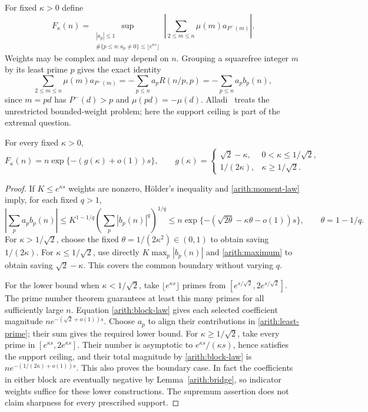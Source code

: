 For fixed $\kappa>0$ define
\[
 F_\kappa(n)=\sup_{\substack{|a_p|\le1\\
 \#\{p\le n:a_p\ne0\}\le\lfloor e^{\kappa s}\rfloor}}
 \left|\sum_{2\le m\le n}\mu(m)a_{P^-(m)}\right|.
\]
Weights may be complex and may depend on $n$. Grouping a squarefree
integer $m$ by its least prime $p$ gives the exact identity
\begin{equation}\label{arith:least-prime}
 \sum_{2\le m\le n}\mu(m)a_{P^-(m)}
 =-\sum_{p\le n}a_p R(n/p,p)=-\sum_{p\le n}a_p b_p(n),
\end{equation}
since $m=pd$ has $P^-(d)>p$ and $\mu(pd)=-\mu(d)$.
Alladi~\cite{alladi1982} treats the unrestricted bounded-weight problem;
here the support ceiling is part of the extremal question.

\begin{theorem}\label{arith:sparse}
For every fixed $\kappa>0$,
\begin{equation}\label{arith:sparse-law}
 F_\kappa(n)=n\exp\{-(g(\kappa)+o(1))s\},\qquad
 g(\kappa)=
 \begin{cases}
 \sqrt2-\kappa,&0<\kappa\le1/\sqrt2,\\
 1/(2\kappa),&\kappa\ge1/\sqrt2.
 \end{cases}
\end{equation}
\end{theorem}
\begin{proof}
If $K\le e^{\kappa s}$ weights are nonzero, H\"older's inequality and
\eqref{arith:moment-law} imply, for each fixed $q>1$,
\[
 \left|\sum_pa_pb_p(n)\right|
 \le K^{1-1/q}\left(\sum_p|b_p(n)|^q\right)^{1/q}
 \le n\exp\{-(\sqrt{2\theta}-\kappa\theta-o(1))s\},
 \qquad\theta=1-1/q.
\]
For $\kappa>1/\sqrt2$, choose the fixed
$\theta=1/(2\kappa^2)\in(0,1)$ to obtain saving $1/(2\kappa)$.
For $\kappa\le1/\sqrt2$, use directly $K\max_p|b_p(n)|$
and \eqref{arith:maximum} to obtain saving $\sqrt2-\kappa$.
This covers the common boundary without varying $q$.

For the lower bound when $\kappa<1/\sqrt2$, take
$\lfloor e^{\kappa s}\rfloor$ primes from
$[e^{s/\sqrt2},2e^{s/\sqrt2}]$. The prime number theorem guarantees
at least this many primes for all sufficiently large $n$.
Equation \eqref{arith:block-law} gives each selected coefficient magnitude
$n e^{-(\sqrt2+o(1))s}$. Choose $a_p$ to align their contributions
in \eqref{arith:least-prime}; their sum gives the required lower bound.
For $\kappa\ge1/\sqrt2$, take every prime in
$[e^{\kappa s},2e^{\kappa s}]$. Their number is asymptotic to
$e^{\kappa s}/(\kappa s)$, hence satisfies the support ceiling, and their
total magnitude by \eqref{arith:block-law} is
$n e^{-(1/(2\kappa)+o(1))s}$. This also proves the boundary case.
In fact the coefficients in either block are eventually negative by
Lemma~\ref{arith:bridge}, so indicator weights suffice for these lower
constructions. The supremum assertion does not claim sharpness for every
prescribed support.
\end{proof}

